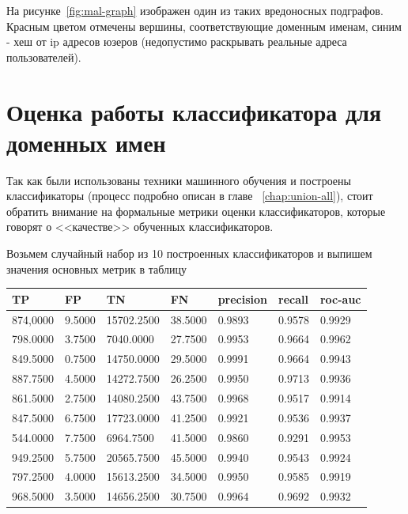 \documentclass[14pt]{extreport} %
\begin{document}
На рисунке~\ref{fig:mal-graph} изображен один из таких вредоносных подграфов. Красным цветом отмечены вершины, соответствующие доменным именам, синим - хеш от ip адресов юзеров (недопустимо раскрывать реальные адреса пользователей). 

\newpage
\section{Оценка работы классификатора для доменных имен}
Так как были использованы техники машинного обучения и построены классификаторы (процесс подробно описан в главе ~\ref{chap:union-all}), стоит обратить внимание на формальные метрики оценки классификаторов, которые говорят о <<качестве>> обученных классификаторов.

Возьмем случайный набор из 10 построенных классификаторов и выпишем значения основных метрик в таблицу

\begin{center}
	\begin{tabular}{ |l|l|l|l|l|l|l|}
		\hline
		TP       & FP     & TN         & FN      & precision & recall & roc-auc \\ \hline
		874,0000 & 9.5000 & 15702.2500 & 38.5000 & 0.9893    & 0.9578 & 0.9929  \\ \hline
		798.0000 & 3.7500 & 7040.0000  & 27.7500 & 0.9953    & 0.9664 & 0.9962  \\ \hline
		849.5000 & 0.7500 & 14750.0000 & 29.5000 & 0.9991    & 0.9664 & 0.9943  \\ \hline
		887.7500 & 4.5000 & 14272.7500 & 26.2500 & 0.9950    & 0.9713 & 0.9936  \\ \hline
		861.5000 & 2.7500 & 14080.2500 & 43.7500 & 0.9968    & 0.9517 & 0.9914  \\ \hline
		847.5000 & 6.7500 & 17723.0000 & 41.2500 & 0.9921    & 0.9536 & 0.9937  \\ \hline
		544.0000 & 7.7500 & 6964.7500  & 41.5000 & 0.9860    & 0.9291 & 0.9953  \\ \hline
		949.2500 & 5.7500 & 20565.7500 & 45.5000 & 0.9940    & 0.9543 & 0.9924  \\ \hline
		797.2500 & 4.0000 & 15613.2500 & 34.5000 & 0.9950    & 0.9585 & 0.9919  \\ \hline
		968.5000 & 3.5000 & 14656.2500 & 30.7500 & 0.9964    & 0.9692 & 0.9932  \\ \hline
	\end{tabular}
\end{center}
\end{document}
